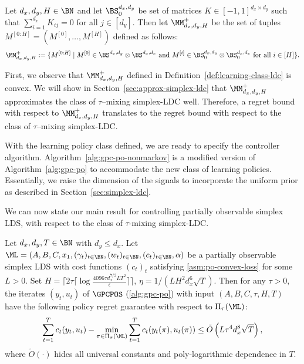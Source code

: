 \begin{definition} 
\label{def:learning-class-ldc}
Let $d_x,d_y,H \in \BN$ and let $\BS_{0}^{d_x,d_y}$ be set of matrices $K\in[-1,1]^{d_x\times d_y}$ such that $\sum_{i=1}^{d_x} K_{ij} = 0$ for all $j \in [d_y]$. Then let $\MM_{d_x,d_y,H}^{+}$ be the set of tuples ${M^{[0:H]}} = (M^{[0]},\dots,M^{[H]})$ defined as follows:
\begin{align}
\label{eq:M-class-nonmarkov}
\MM_{d_x,d_y,H}^{+} := \{M^{[0:H]}\mid M^{[0]}\in\BS^{d_x,d_y}\otimes \BS^{d_x,d_x} \text{ and } M^{[i]}\in\BS_{0}^{d_x,d_y}\otimes \BS_{0}^{d_x,d_x} \text{ for all }  i \in [H]\}.
\end{align}
\end{definition}
First, we observe that $\MM_{d_x,d_y,H}^{+}$ defined in Definition~\ref{def:learning-class-ldc} is convex. We will show in Section~\ref{sec:approx-simplex-ldc} that $\MM_{d_x,d_y,H}^{+}$ approximates the class of $\tau$--mixing simplex-LDC well. Therefore, a regret bound with respect to $\MM_{d_x,d_y,H}^{+}$ translates to the regret bound with respect to the class of $\tau$--mixing simplex-LDC. 

With the learning policy class defined, we are ready to specify the controller algorithm. Algorithm~\ref{alg:gpc-po-nonmarkov} is a modified version of Algorithm~\ref{alg:gpc-po} to accommodate the new class of learning policies. Essentially, we raise the dimension of the signals to incorporate the uniform prior as described in Section~\ref{sec:simplex-ldc}. 

We can now state our main result for controlling partially observable simplex LDS, with respect to the class of $\tau$-mixing simplex-LDC.

\begin{theorem} 
Let $d_x,d_y, T\in\BN$ with $d_y\leq d_x$. Let $\ML=(A,B, C, x_1,(\gamma_t)_{t\in\BN},(w_t)_{t\in\BN},(c_t)_{t\in\BN}, \alpha)$ be a partially observable simplex LDS with cost functions $(c_t)_t$ satisfying \cref{asm:po-convex-loss} for some $L > 0$. Set $H=\lceil 2\tau\lceil \log\frac{4096\tau d_x^{7/2} L T^2}{\epsilon}\rceil \rceil$, $\eta=1/(LH^{2}d_x^{6}\sqrt{T})$. Then for any $\tau > 0$, the iterates  $(y_t, u_t)$ of $\GPCPOS$ (\cref{alg:gpc-po}) with input $(A, B, C, \tau, H,T)$ have the following policy regret guarantee with respect to $\Pi_{\tau}(\ML)$: \begin{align*}
\sum_{t=1}^T c_t(y_t,u_t)-\min_{\pi\in\Pi_{\tau}(\ML)}\sum_{t=1}^T c_t(y_t(\pi),u_t(\pi))\le \tilde{O}\left(L\tau^{4}d_x^{8}\sqrt{T}\right),
\end{align*}
where $\tilde{O}(\cdot)$ hides all universal constants and poly-logarithmic dependence in $T$. 
\end{theorem}


